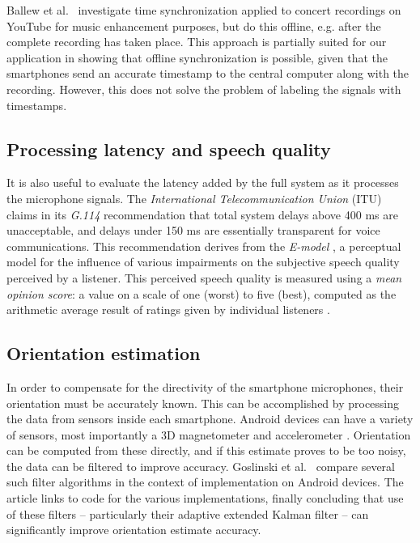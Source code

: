 Ballew et al.\ \cite{ballew2011} investigate time synchronization applied to concert recordings on YouTube for music enhancement purposes, but do this offline, e.g. after the complete recording has taken place. This approach is partially suited for our application in showing that offline synchronization is possible, given that the smartphones send an accurate timestamp to the central computer along with the recording. However, this does not solve the problem of labeling the signals with timestamps.

\subsection{Processing latency and speech quality}
It is also useful to evaluate the latency added by the full system as it processes the microphone signals. The \textit{International Telecommunication Union} (ITU) claims in its \textit{G.114} recommendation \cite{itu-g114} that total system delays above 400 ms are unacceptable, and delays under 150 ms are essentially transparent for voice communications. This recommendation derives from the \textit{E-model} \cite{itu-g107}, a perceptual model for the influence of various impairments on the subjective speech quality perceived by a listener. This perceived speech quality is measured using a \textit{mean opinion score}: a value on a scale of one (worst) to five (best), computed as the arithmetic average result of ratings given by individual listeners \cite{itu-p800}.

\subsection{Orientation estimation}
In order to compensate for the directivity of the smartphone microphones, their orientation must be accurately known. This can be accomplished by processing the data from sensors inside each smartphone. Android devices can have a variety of sensors, most importantly a 3D magnetometer and accelerometer \cite{android-sensors}. Orientation can be computed from these directly, and if this estimate proves to be too noisy, the data can be filtered to improve accuracy. Goslinski et al.\ \cite{goslinski2015} compare several such filter algorithms in the context of implementation on Android devices. The article links to code for the various implementations, finally concluding that use of these filters -- particularly their adaptive extended Kalman filter -- can significantly improve orientation estimate accuracy.